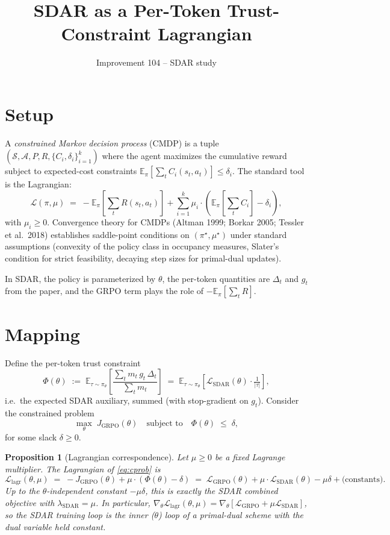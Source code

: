 \documentclass[11pt]{article}
\title{SDAR as a Per-Token Trust-Constraint Lagrangian}
\author{Improvement 104 -- SDAR study}
\date{}
\newtheorem{proposition}{Proposition}
\newcommand{\Lsdar}{\mathcal{L}_{\mathrm{SDAR}}}
\newcommand{\Lgrpo}{\mathcal{L}_{\mathrm{GRPO}}}
\newcommand{\Jgrpo}{J_{\mathrm{GRPO}}}
\begin{document}
\maketitle

\section*{Setup}

A \emph{constrained Markov decision process} (CMDP) is a tuple $(\mathcal{S}, \mathcal{A}, P, R, \{C_i, \delta_i\}_{i=1}^k)$ where the agent maximizes the cumulative reward subject to expected-cost constraints $\mathbb{E}_\pi\left[\sum_t C_i(s_t, a_t)\right] \leq \delta_i$. The standard tool is the Lagrangian:
\[
\mathcal{L}(\pi, \mu) \;=\; -\mathbb{E}_\pi\left[\sum_t R(s_t, a_t)\right] + \sum_{i=1}^k \mu_i \cdot \left(\mathbb{E}_\pi\!\left[\sum_t C_i\right] - \delta_i\right),
\]
with $\mu_i \geq 0$. Convergence theory for CMDPs (Altman 1999; Borkar 2005; Tessler et al.\ 2018) establishes saddle-point conditions on $(\pi^\star, \mu^\star)$ under standard assumptions (convexity of the policy class in occupancy measures, Slater's condition for strict feasibility, decaying step sizes for primal-dual updates).

In SDAR, the policy is parameterized by $\theta$, the per-token quantities are $\Delta_t$ and $g_t$ from the paper, and the GRPO term plays the role of $-\mathbb{E}_\pi\left[\sum_t R\right]$.

\section*{Mapping}

Define the per-token trust constraint
\[
\Phi(\theta) \;:=\; \mathbb{E}_{\tau \sim \pi_\theta}\!\left[\frac{\sum_t m_t\, g_t\, \Delta_t}{\sum_t m_t}\right] \;=\; \mathbb{E}_{\tau \sim \pi_\theta}\!\left[\Lsdar(\theta) \cdot \tfrac{1}{|\tau|}\right],
\]
i.e.\ the expected SDAR auxiliary, summed (with stop-gradient on $g_t$). Consider the constrained problem
\begin{equation}\label{eq:cprob}
\max_\theta \;\Jgrpo(\theta) \quad \text{subject to} \quad \Phi(\theta) \;\leq\; \delta,
\end{equation}
for some slack $\delta \geq 0$.

\begin{proposition}[Lagrangian correspondence]\label{prop:corr}
Let $\mu \geq 0$ be a fixed Lagrange multiplier. The Lagrangian of \eqref{eq:cprob} is
\[
\mathcal{L}_{\mathrm{lagr}}(\theta, \mu) \;=\; -\Jgrpo(\theta) + \mu \cdot (\Phi(\theta) - \delta) \;=\; \Lgrpo(\theta) + \mu \cdot \Lsdar(\theta) - \mu \delta + \text{(constants)}.
\]
Up to the $\theta$-independent constant $-\mu \delta$, this is exactly the SDAR combined objective with $\lambda_{\mathrm{SDAR}} = \mu$. In particular, $\nabla_\theta \mathcal{L}_{\mathrm{lagr}}(\theta, \mu) = \nabla_\theta\!\left[\Lgrpo + \mu \Lsdar\right]$, so the SDAR training loop is the inner ($\theta$) loop of a \emph{primal-dual scheme with the dual variable held constant}.
\end{proposition}
\end{document}
